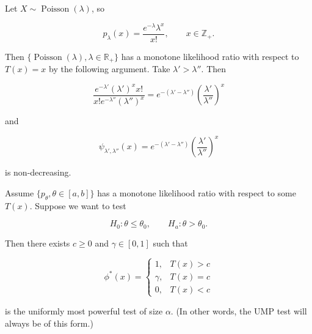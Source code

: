 \begin{example}

Let \(X \sim \operatorname{Poisson}(\lambda)\), so 

\[
p_\lambda(x) =  \frac{e^{-\lambda} \lambda^x}{x!}, \qquad x \in \mathbb{Z}_+.
\]

Then  \(\{ \operatorname{Poisson}(\lambda), \lambda \in \mathbb{R}_+\}\) has a monotone likelihood ratio with respect to \(T(x) =x\) by the following argument. Take \(\lambda' > \lambda ''\). Then 

\[
\frac{e^{- \lambda '} (\lambda')^x x! }{x! e^{-\lambda ''} (\lambda'')^x }=  e^{-(\lambda' - \lambda'')} \left( \frac{ \lambda'}{\lambda ''} \right)^x
\]

and

\[
\psi_{\lambda', \lambda''}(x) = e^{-(\lambda' - \lambda'')} \left( \frac{ \lambda'}{\lambda ''} \right)^x
\]

is non-decreasing. 

\end{example}

\begin{theorem}\label{mathstasts.thm.karlin.rubin}

Assume \(\{p_\theta, \theta \in[a,b]\}\) has a monotone likelihood ratio with respect to some \(T(x)\). Suppose we want to test

\[
H_0: \theta \leq \theta_0, \qquad H_a: \theta > \theta_0.
\]

Then there exists \(c \geq 0\) and \(\gamma \in [0,1]\) such that 

\[
\phi^*(x) = \begin{cases}
1, &  T(x) >c \\
\gamma, & T(x) = c \\
0, & T(x) < c
\end{cases}
\]

is the uniformly most powerful test of size \(\alpha\). (In other words, the UMP test will always be of this form.)

\end{theorem}


